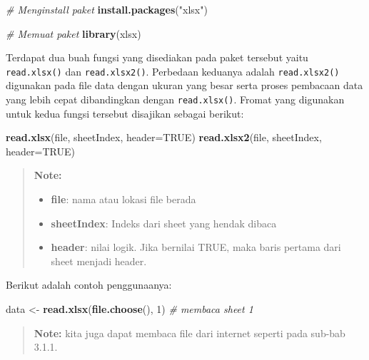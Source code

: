 \documentclass[]{book}
\newenvironment{Shaded}{\begin{snugshade}}{\end{snugshade}}
\newcommand{\KeywordTok}[1]{\textcolor[rgb]{0.13,0.29,0.53}{\textbf{#1}}}
\newcommand{\DataTypeTok}[1]{\textcolor[rgb]{0.13,0.29,0.53}{#1}}
\newcommand{\DecValTok}[1]{\textcolor[rgb]{0.00,0.00,0.81}{#1}}
\newcommand{\StringTok}[1]{\textcolor[rgb]{0.31,0.60,0.02}{#1}}
\newcommand{\CommentTok}[1]{\textcolor[rgb]{0.56,0.35,0.01}{\textit{#1}}}
\newcommand{\OtherTok}[1]{\textcolor[rgb]{0.56,0.35,0.01}{#1}}
\newcommand{\NormalTok}[1]{#1}
\providecommand{\tightlist}{%
  \setlength{\itemsep}{0pt}\setlength{\parskip}{0pt}}
\begin{document}
\begin{Shaded}
\begin{Highlighting}[]
\CommentTok{# Menginstall paket}
\KeywordTok{install.packages}\NormalTok{(}\StringTok{"xlsx"}\NormalTok{)}

\CommentTok{# Memuat paket}
\KeywordTok{library}\NormalTok{(xlsx)}
\end{Highlighting}
\end{Shaded}

Terdapat dua buah fungsi yang disediakan pada paket tersebut yaitu
\texttt{read.xlsx()} dan \texttt{read.xlsx2()}. Perbedaan keduanya
adalah \texttt{read.xlsx2()} digunakan pada file data dengan ukuran yang
besar serta proses pembacaan data yang lebih cepat dibandingkan dengan
\texttt{read.xlsx()}. Fromat yang digunakan untuk kedua fungsi tersebut
disajikan sebagai berikut:

\begin{Shaded}
\begin{Highlighting}[]
\KeywordTok{read.xlsx}\NormalTok{(file, sheetIndex, }\DataTypeTok{header=}\OtherTok{TRUE}\NormalTok{)}
\KeywordTok{read.xlsx2}\NormalTok{(file, sheetIndex, }\DataTypeTok{header=}\OtherTok{TRUE}\NormalTok{)}
\end{Highlighting}
\end{Shaded}

\begin{quote}
\textbf{Note: }

\begin{itemize}
\tightlist
\item
  \textbf{file}: nama atau lokasi file berada
\item
  \textbf{sheetIndex}: Indeks dari sheet yang hendak dibaca
\item
  \textbf{header}: nilai logik. Jika bernilai TRUE, maka baris pertama
  dari sheet menjadi header.
\end{itemize}
\end{quote}

Berikut adalah contoh penggunaanya:

\begin{Shaded}
\begin{Highlighting}[]
\NormalTok{data <-}\StringTok{ }\KeywordTok{read.xlsx}\NormalTok{(}\KeywordTok{file.choose}\NormalTok{(), }\DecValTok{1}\NormalTok{) }\CommentTok{# membaca sheet 1}
\end{Highlighting}
\end{Shaded}

\begin{quote}
\textbf{Note: } kita juga dapat membaca file dari internet seperti pada
sub-bab 3.1.1.
\end{quote}
\end{document}
